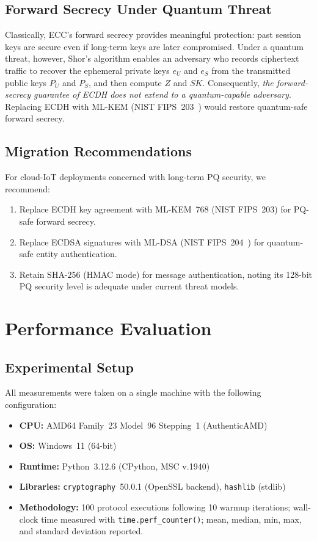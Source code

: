 \documentclass[journal]{IEEEtran}
\newcommand{\SK}{\mathit{SK}}          %
\begin{document}
\subsection{Forward Secrecy Under Quantum Threat}

Classically, ECC's forward secrecy provides meaningful protection: past
session keys are secure even if long-term keys are later compromised.
Under a quantum threat, however, Shor's algorithm enables an adversary who
records ciphertext traffic to recover the ephemeral private keys $e_U$ and
$e_S$ from the transmitted public keys $P_U$ and $P_S$, and then compute $Z$
and $\SK$. Consequently, \emph{the forward-secrecy guarantee of ECDH does not
extend to a quantum-capable adversary}. Replacing ECDH with ML-KEM
(NIST FIPS~203~\cite{NISTFIPS203}) would restore quantum-safe forward secrecy.

\subsection{Migration Recommendations}

For cloud-IoT deployments concerned with long-term PQ security, we recommend:
\begin{enumerate}
  \item Replace ECDH key agreement with ML-KEM~768 (NIST FIPS~203) for
    PQ-safe forward secrecy.
  \item Replace ECDSA signatures with ML-DSA (NIST FIPS~204~\cite{NISTFIPS204})
    for quantum-safe entity authentication.
  \item Retain SHA-256 (HMAC mode) for message authentication, noting its
    128-bit PQ security level is adequate under current threat models.
\end{enumerate}

\section{Performance Evaluation}
\label{sec:perf}

\subsection{Experimental Setup}

All measurements were taken on a single machine with the following
configuration:
\begin{itemize}
  \item \textbf{CPU:} AMD64 Family~23 Model~96 Stepping~1 (AuthenticAMD)
  \item \textbf{OS:} Windows~11 (64-bit)
  \item \textbf{Runtime:} Python~3.12.6 (CPython, MSC v.1940)
  \item \textbf{Libraries:} \texttt{cryptography}~50.0.1 (OpenSSL backend),
    \texttt{hashlib} (stdlib)
  \item \textbf{Methodology:} 100 protocol executions following 10 warmup
    iterations; wall-clock time measured with \texttt{time.perf\_counter()};
    mean, median, min, max, and standard deviation reported.
\end{itemize}
\end{document}
